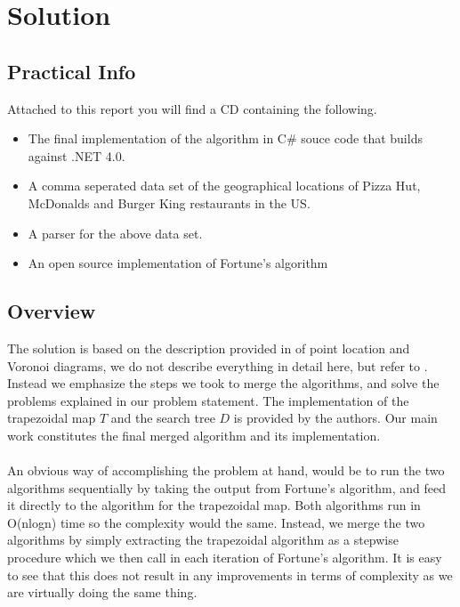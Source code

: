 \section{Solution}
\subsection{Practical Info}
Attached to this report you will find a CD containing the following.
\begin{itemize}
  \item The final implementation of the algorithm in C\# souce code that builds against .NET 4.0.
  \item A comma seperated data set of the geographical locations of Pizza Hut, McDonalds and Burger King restaurants in the US.
  \item A parser for the above data set.
  \item An open source implementation of Fortune's algorithm \cite{fortunes}
\end{itemize}

\subsection{Overview}
The solution is based on the description provided in \cite{computational_geometry} of point location and Voronoi diagrams, we do not describe everything in detail here, but refer to \cite{computational_geometry}. Instead we emphasize the steps we took to merge the algorithms, and solve the problems explained in our problem statement. The implementation of the trapezoidal map $T$ and the search tree $D$ is provided by the authors. Our main work constitutes the final merged algorithm and its implementation.
\paragraph{}
An obvious way of accomplishing the problem at hand, would be to run the two algorithms sequentially by taking the output from Fortune's algorithm, and feed it directly to the algorithm for the trapezoidal map. Both algorithms run in O(nlogn)  time so the complexity would the same. Instead, we merge the two algorithms by simply extracting the trapezoidal algorithm as a stepwise procedure which we then call in each iteration of Fortune's algorithm. It is easy to see that this does not result in any improvements in terms of complexity as we are virtually doing the same thing.  

